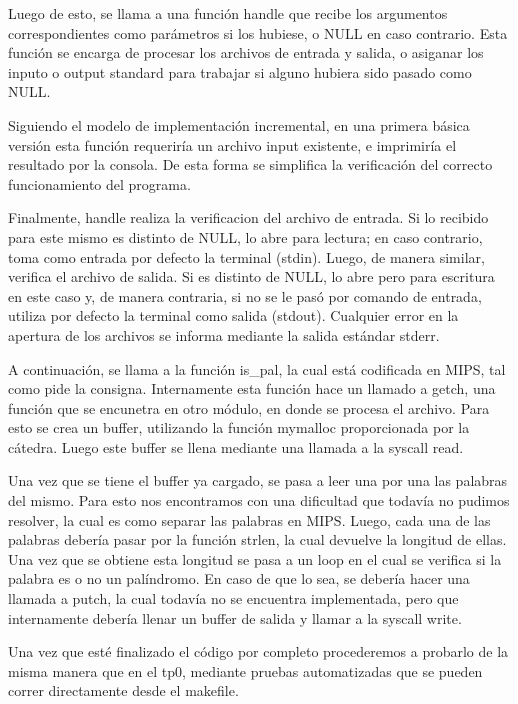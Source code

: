 \documentclass[10pt,a4paper]{article}
\begin{document}
Luego de esto, se llama a una función handle que recibe los argumentos correspondientes como parámetros si los hubiese, o NULL en caso contrario. Esta función se encarga de procesar los archivos de entrada y salida, o asiganar los inputo o output standard para trabajar si alguno hubiera sido pasado como NULL.

Siguiendo el modelo de implementación incremental, en una primera básica versión esta función requeriría un archivo input existente, e imprimiría el resultado por la consola. De esta forma se simplifica la verificación del correcto funcionamiento del programa.

Finalmente, handle realiza la verificacion del archivo de entrada. Si lo recibido para este mismo es distinto de NULL, lo abre para lectura; en caso contrario, toma como entrada por defecto la terminal (stdin). Luego, de manera similar, verifica el archivo de salida. Si es distinto de NULL, lo abre pero para escritura en este caso y, de manera contraria, si no se le pasó por comando de entrada, utiliza por defecto la terminal como salida (stdout). Cualquier error en la apertura de los archivos se informa mediante la salida estándar stderr.

A continuación, se llama a la función is\_pal, la cual está codificada en MIPS, tal como pide la consigna. Internamente esta función hace un llamado a getch, una función que se encunetra en otro módulo, en donde se procesa el archivo. Para esto se crea un buffer, utilizando la función mymalloc proporcionada por la cátedra. Luego este buffer se llena mediante una llamada a la syscall read.

Una vez que se tiene el buffer ya cargado, se pasa a leer una por una las palabras del mismo. Para esto nos encontramos con una dificultad que todavía no pudimos resolver, la cual es como separar las palabras en MIPS. Luego, cada una de las palabras debería pasar por la función strlen, la cual devuelve la longitud de ellas. Una vez que se obtiene esta longitud se pasa a un loop en el cual se verifica si la palabra es o no un palíndromo. En caso de que lo sea, se debería hacer una llamada a putch, la cual todavía no se encuentra implementada, pero que internamente debería llenar un buffer de salida y llamar a la syscall write.

Una vez que esté finalizado el código por completo procederemos a probarlo de la misma manera que en el tp0, mediante pruebas automatizadas que se pueden correr directamente desde el makefile.

\newpage
\end{document}
